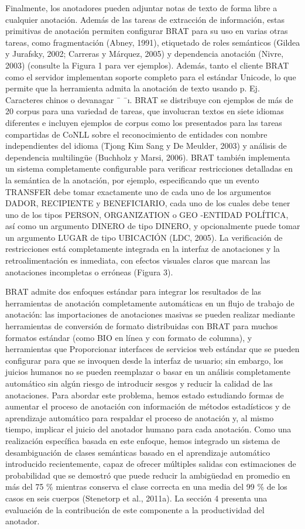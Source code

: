 Finalmente, los anotadores pueden adjuntar notas de texto de forma libre a cualquier anotación. Además de las tareas de extracción de información, estas primitivas de anotación permiten configurar BRAT para su uso en varias otras tareas, como fragmentación (Abney, 1991), etiquetado de roles semánticos (Gildea y Jurafsky, 2002; Carreras y Márquez, 2005) y dependencia anotación (Nivre, 2003) (consulte la Figura 1 para ver ejemplos). Además, tanto el cliente BRAT como el servidor implementan soporte completo para el estándar Unicode, lo que permite que la herramienta admita la anotación de texto usando p. Ej. Caracteres chinos o devanagar ¯ ¯ı. BRAT se distribuye con ejemplos de más de 20 corpus para una variedad de tareas, que involucran textos en siete idiomas diferentes e incluyen ejemplos de corpus como los presentados para las tareas compartidas de CoNLL sobre el reconocimiento de entidades con nombre independientes del idioma (Tjong Kim Sang y De Meulder, 2003) y análisis de dependencia multilingüe (Buchholz y Marsi, 2006). BRAT también implementa un sistema completamente configurable para verificar restricciones detalladas en la semántica de la anotación, por ejemplo, especificando que un evento TRANSFER debe tomar exactamente uno de cada uno de los argumentos DADOR, RECIPIENTE y BENEFICIARIO, cada uno de los cuales debe tener uno de los tipos PERSON, ORGANIZATION o GEO -ENTIDAD POLÍTICA, así como un argumento DINERO de tipo DINERO, y opcionalmente puede tomar un argumento LUGAR de tipo UBICACIÓN (LDC, 2005). La verificación de restricciones está completamente integrada en la interfaz de anotaciones y la retroalimentación es inmediata, con efectos visuales claros que marcan las anotaciones incompletas o erróneas (Figura 3).

BRAT admite dos enfoques estándar para integrar los resultados de las herramientas de anotación completamente automáticas en un flujo de trabajo de anotación: las importaciones de anotaciones masivas se pueden realizar mediante herramientas de conversión de formato distribuidas con BRAT para muchos formatos estándar (como BIO en línea y con formato de columna), y herramientas que Proporcionar interfaces de servicios web estándar que se pueden configurar para que se invoquen desde la interfaz de usuario; sin embargo, los juicios humanos no se pueden reemplazar o basar en un análisis completamente automático sin algún riesgo de introducir sesgos y reducir la calidad de las anotaciones. Para abordar este problema, hemos estado estudiando formas de aumentar el proceso de anotación con información de métodos estadísticos y de aprendizaje automático para respaldar el proceso de anotación y, al mismo tiempo, implicar el juicio del anotador humano para cada anotación. Como una realización específica basada en este enfoque, hemos integrado un sistema de desambiguación de clases semánticas basado en el aprendizaje automático introducido recientemente, capaz de ofrecer múltiples salidas con estimaciones de probabilidad que se demostró que puede reducir la ambigüedad en promedio en más del 75 \% mientras conserva el clase correcta en una media del 99 \% de los casos en seis cuerpos (Stenetorp et al., 2011a). La sección 4 presenta una evaluación de la contribución de este componente a la productividad del anotador.


